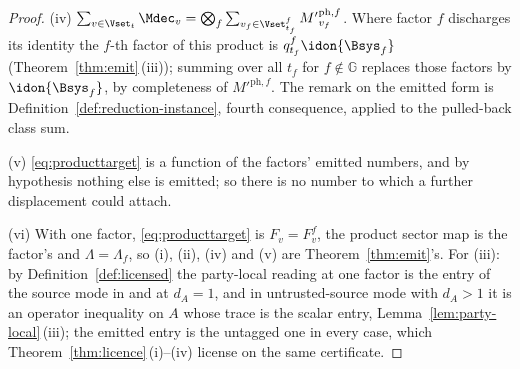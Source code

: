 \begin{proof}
(iv) $\sum_{v\in\Vset_t}\Mdec_v
=\bigotimes_f\sum_{v_f\in\Vset^{f}_{t_f}}{M'}^{\mathrm{ph},f}_{v_f}$. Where factor $f$
discharges its identity the $f$-th factor of this product is
$q^{f}_{t_f}\idon{\Bsys_f}$ (Theorem~\ref{thm:emit}\,(iii)); summing over all
$t_f$ for $f\notin\mathbb{G}$ replaces those factors by $\idon{\Bsys_f}$, by
completeness of ${M'}^{\mathrm{ph},f}$. The remark on the emitted form is
Definition~\ref{def:reduction-instance}, fourth consequence, applied to the
pulled-back class sum.

(v) \eqref{eq:producttarget} is a function of the factors' emitted numbers,
and by hypothesis nothing else is emitted; so there is no number to which a
further displacement could attach.

(vi) With one factor, \eqref{eq:producttarget} is $F_v=F^{f}_v$, the product
sector map is the factor's and $\Lambda=\Lambda_f$, so (i), (ii), (iv) and
(v) are Theorem~\ref{thm:emit}'s. For (iii): by
Definition~\ref{def:licensed} the party-local reading at one factor is the
entry of the source mode in  and at $d_A=1$, and in
untrusted-source mode with $d_A>1$ it is an operator inequality on $A$ whose
trace is the scalar entry, Lemma~\ref{lem:party-local}\,(iii); the emitted
entry is the untagged one in every case, which
Theorem~\ref{thm:licence}\,(i)--(iv) license on the same certificate.
\end{proof}
